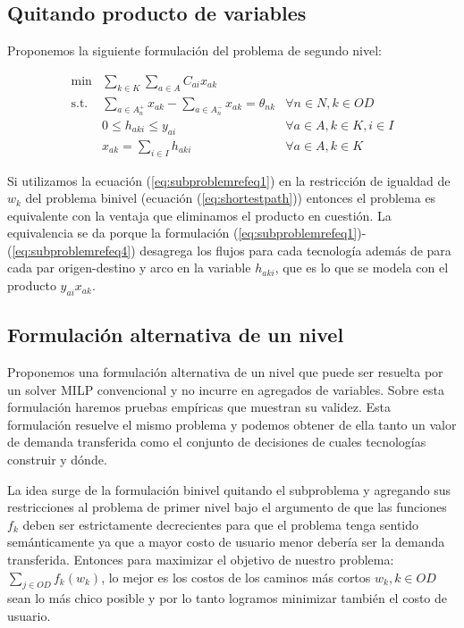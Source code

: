 \documentclass{article}
\begin{document}
  \subsection{Quitando producto de variables}
  \label{sect:variableproductremoval}

  Proponemos la siguiente formulación del problema de segundo nivel:

  \begin{align}
    \text{min}  & \sum_{k \in K} \sum_{a \in A} C_{ai} x_{ak}         & \label{eq:subproblemrefeq1} \\
    \text{s.t.} & \sum_{a \in A_n^+} x_{ak} - \sum_{a \in A_n^-} x_{ak} = \theta_{nk} & \forall n \in N, k \in OD \\
                & 0 \leq h_{aki} \leq y_{ai}                                          & \forall a \in A, k \in K, i \in I \\
                & x_{ak} = \sum_{i \in I} h_{aki}                                     & \forall a \in A, k \in K \label{eq:subproblemrefeq4}
  \end{align}

  Si utilizamos la ecuación (\ref{eq:subproblemrefeq1}) en la restricción de igualdad de $w_k$ del problema binivel (ecuación (\ref{eq:shortestpath})) entonces el problema es equivalente con la ventaja que eliminamos el producto en cuestión. La equivalencia se da porque la formulación (\ref{eq:subproblemrefeq1})-(\ref{eq:subproblemrefeq4}) desagrega los flujos para cada tecnología además de para cada par origen-destino y arco en la variable $h_{aki}$, que es lo que se modela con el producto $y_{ai} x_{ak}$.

  \subsection{Formulación alternativa de un nivel}
  \label{sect:singlelevelformulation}

  Proponemos una formulación alternativa de un nivel que puede ser resuelta por un solver MILP convencional y no incurre en agregados de variables. Sobre esta formulación haremos pruebas empíricas que muestran su validez. Esta formulación resuelve el mismo problema y podemos obtener de ella tanto un valor de demanda transferida como el conjunto de decisiones de cuales tecnologías construir y dónde.

  La idea surge de la formulación binivel quitando el subproblema y agregando sus restricciones al problema de primer nivel bajo el argumento de que las funciones $f_k$ deben ser estrictamente decrecientes para que el problema tenga sentido semánticamente ya que a mayor costo de usuario menor debería ser la demanda transferida. Entonces para maximizar el objetivo de nuestro problema: $\sum_{j \in OD}f_k(w_k)$, lo mejor es los costos de los caminos más cortos $w_k, k \in OD$ sean lo más chico posible y por lo tanto logramos minimizar también el costo de usuario.
\end{document}
